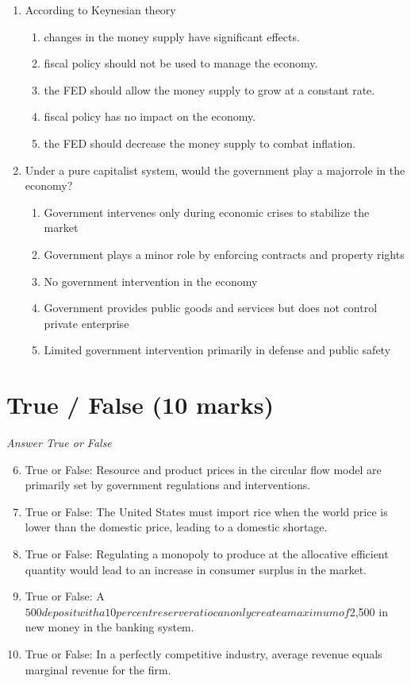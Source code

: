 \documentclass[12pt]{article}
\begin{document}
\begin{enumerate}[label=\arabic*.]
\item According to Keynesian theory
\begin{enumerate}[label=(\alph*)]
    \item changes in the money supply have significant effects.
    \item fiscal policy should not be used to manage the economy.
    \item the FED should allow the money supply to grow at a constant rate.
    \item fiscal policy has no impact on the economy.
    \item the FED should decrease the money supply to combat inflation.
\end{enumerate}
\item Under a pure capitalist system, would the government play a majorrole in the economy?
\begin{enumerate}[label=(\alph*)]
    \item Government intervenes only during economic crises to stabilize the market
    \item Government plays a minor role by enforcing contracts and property rights
    \item No government intervention in the economy
    \item Government provides public goods and services but does not control private enterprise
    \item Limited government intervention primarily in defense and public safety
\end{enumerate}
\end{enumerate}

\section*{True / False (10 marks)}
\textit{Answer True or False}
\begin{enumerate}[label=\arabic*.]
\setcounter{enumi}{5}
\item True or False: Resource and product prices in the circular flow model are primarily set by government regulations and interventions.
\item True or False: The United States must import rice when the world price is lower than the domestic price, leading to a domestic shortage.
\item True or False: Regulating a monopoly to produce at the allocative efficient quantity would lead to an increase in consumer surplus in the market.
\item True or False: A $500 deposit with a 10 percent reserve ratio can only create a maximum of $2,500 in new money in the banking system.
\item True or False: In a perfectly competitive industry, average revenue equals marginal revenue for the firm.
\end{enumerate}
\end{document}
